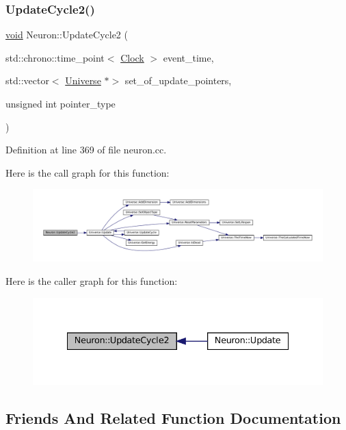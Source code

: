 \subsubsection{\texorpdfstring{Update\+Cycle2()}{UpdateCycle2()}}
{\footnotesize\ttfamily \mbox{\hyperlink{glad_8h_a950fc91edb4504f62f1c577bf4727c29}{void}} Neuron\+::\+Update\+Cycle2 (\begin{DoxyParamCaption}\item[{std\+::chrono\+::time\+\_\+point$<$ \mbox{\hyperlink{universe_8h_a0ef8d951d1ca5ab3cfaf7ab4c7a6fd80}{Clock}} $>$}]{event\+\_\+time,  }\item[{std\+::vector$<$ \mbox{\hyperlink{class_universe}{Universe}} $\ast$$>$}]{set\+\_\+of\+\_\+update\+\_\+pointers,  }\item[{unsigned int}]{pointer\+\_\+type }\end{DoxyParamCaption})}



Definition at line 369 of file neuron.\+cc.

Here is the call graph for this function\+:\nopagebreak
\begin{figure}[H]
\begin{center}
\leavevmode
\includegraphics[width=350pt]{class_neuron_a55c72e8066caf1ad8e25a2b0b453ee69_cgraph}
\end{center}
\end{figure}
Here is the caller graph for this function\+:\nopagebreak
\begin{figure}[H]
\begin{center}
\leavevmode
\includegraphics[width=335pt]{class_neuron_a55c72e8066caf1ad8e25a2b0b453ee69_icgraph}
\end{center}
\end{figure}


\subsection{Friends And Related Function Documentation}
\mbox{\label{class_neuron_a2ae3e36fe53bb2c406559e5a7c309027}} 
